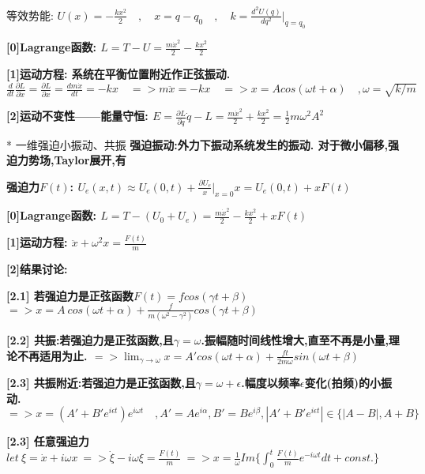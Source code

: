             等效势能:
            $U(x) = - \frac{k x^2}{2} \quad , \quad x = q-q_0 \quad ,\quad k = \frac{d^2 U(q)}{dq^2}|_{q=q_0}$
            
            \bf{[0]Lagrange函数}:
            $L = T - U = \frac{m \dot x^2}{2} - \frac{k x^2}{2}$
            
            \bf{[1]运动方程}: 系统在平衡位置附近作正弦振动.
            $\frac{d}{dt} \frac{∂ L}{∂ \dot x} = \frac{∂ L}{∂ x} = \frac{d m\dot x}{dt} = -kx \quad => m \ddot x = -kx \quad => x = A cos(\omega t + \alpha) \quad , \omega = \sqrt{k/m}$
            
            \bf{[2]运动不变性——能量守恒}:
            $E = \frac{∂ L}{∂ \dot q}\dot q - L = \frac{m \dot x^2}{2} + \frac{k x^2}{2} = \frac{1}{2} m \omega^2 A^2$


        * 一维强迫小振动、共振
            \bf{强迫振动}:外力下振动系统发生的振动. 对于微小偏移,强迫力势场,Taylor展开,有
            
            \bf{强迫力$F(t)$}:
                $U_e(x,t) \approx U_e(0,t) + \frac{∂ U_e}{x}|_{x=0}x = U_e(0,t) + xF(t)$
            
            \bf{[0]Lagrange函数}:
                $L = T - (U_0 + U_e) = \frac{m \dot x^2}{2} - \frac{k x^2}{2} + xF(t)$
            
            \bf{[1]运动方程}:
                $\ddot x + \omega^2 x = \frac{F(t)}{m}$
            
            \bf{[2]结果讨论}:
            
            \bf{[2.1]} 若强迫力是正弦函数$F(t) = f cos(\gamma t + \beta)$
                $=> x = A\ cos(\omega t + \alpha) + \frac{f}{m(\omega^2 - \gamma^2)} cos(\gamma t + \beta)$
                
            \bf{[2.2]} \bf{共振}:若强迫力是正弦函数,且$\gamma = \omega$.\quad 振幅随时间线性增大,直至不再是小量,理论不再适用为止.
            $=> \lim_{\gamma \to \omega}x = A'cos(\omega t + \alpha) + \frac{f t}{2m\omega} sin(\omega t + \beta)$
            
            \bf{[2.3]} 共振附近:若强迫力是正弦函数,且$\gamma = \omega + \epsilon$.\quad 幅度以频率$\epsilon$变化(\bf{拍频})的小振动.
            $=> x = (A' + B' e^{i\epsilon t})e^{i\omega t} \quad ,A' = Ae^{i\alpha},B' = Be^{i\beta},|A' + B' e^{i\epsilon t}| \in \{|A-B|,A+B\} $
            
            \bf{[2.3]} 任意强迫力
            $let\ \xi = \dot x + i\omega x\ => \dot \xi - i\omega \xi = \frac{F(t)}{m}  \ => x = \frac{1}{\omega}Im\{\int_0^t \frac{F(t)}{m}e^{-i\omega t}dt + const.\}$



